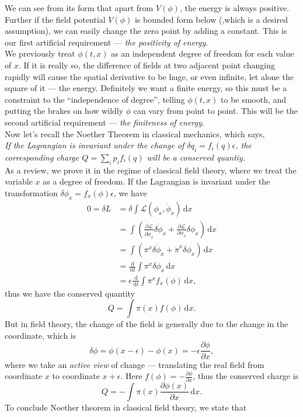 \documentclass{article}
\newcommand{\be}{\begin{equation}}
\newcommand{\ee}{\end{equation}}
\newcommand{\bs}{\be\begin{split}}
\newcommand{\dif}{\,\mathrm{d}}
\newcommand{\p}{\partial}
\newcommand{\1}{\left}
\newcommand{\2}{\right}
\newcommand{\ma}{\mathcal}
\begin{document}
We can see from its form that apart from $V(\phi)$, the energy is always positive. Further if the field potential  $V(\phi)$ is bounded form below (,which is a desired assumption), we can easily change the zero point by adding a constant. This is our first artificial requirement --- \textit{the positivity of energy}.\\

We previously treat $\phi(t,x)$ as an independent degree of freedom for each value of $x$. If it is really so, the difference of fields at two adjacent point changing rapidly will cause the spatial derivative to be huge, or even infinite, let alone the square of it --- the energy. Definitely we want a finite energy, so this must be a constraint to the ``independence of degree'', telling $\phi(t,x)$ to be smooth, and putting the brakes on how wildly $\phi$ can vary from point to point. This will be the second artificial requirement --- \textit{the finiteness of energy}.\\

Now let's recall the Noether Theorem in classical mechanics, which says,\\

\textit{If the Lagrangian is invariant under the change of $\delta q_i=f_i(q)\epsilon$, the corresponding charge $Q=\sum_i p_i f_i(q)$ will be a conserved quantiy.}\\

As a review, we prove it in the regime of classical field theory, where we treat the variable $x$ as a degree of freedom.
If the Lagrangian is invariant under the transformation $\delta\phi_x=f_x(\phi)\epsilon$, we have
\bs
0=\delta L&= \delta\int\ma L(\phi_x, \dot \phi_x)\dif x\\
&=\int\1( \frac{\p\ma L}{\p\dot\phi_x}\delta\dot\phi_x+\frac{\p\ma L}{\p\phi_x}\delta\phi_x\2)\dif x \\
&=\int\1( \pi^x\delta\dot\phi_x+\dot\pi^x\delta\phi_x\2)\dif x\\
&=\frac{\dif}{\dif t}\int\pi^x\delta\phi_x\dif x\\
&=\epsilon\frac{\dif}{\dif t}\int \pi^x f_x(\phi) \dif x,
\end{split}\ee
thus we have the conserved quantity
\be
Q=\int \pi(x) f(\phi) \dif x.
\ee
But in field theory, the change of the field is generally due to the change in the coordinate, which is 
\be
\delta\phi=\phi(x-\epsilon)-\phi(x)=-\epsilon\frac{\p\phi}{\p x},
\ee
where we take an \textit{active view} of change --- translating the real field from coordinate $x$ to coordinate $x+\epsilon$. Here $f(\phi)=-\frac{\p\phi}{\p x}$, thus the conserved charge is
\be
Q=-\int \pi(x) \frac{\p\phi(x)}{\p x} \dif x.
\ee
To conclude Noether theorem in classical field theory, we state that\\
\end{document}
